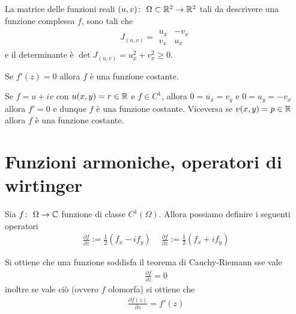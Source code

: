 \begin{corollary}
	La matrice delle funzioni reali $(u,v) \colon\ \Omega \subset \mathbb{R}^2 \rightarrow \mathbb{R}^2$ tali da descrivere una funzione complessa $f$, sono tali che  
	\begin{equation}
	\begin{aligned}
		J_{(u,v)} = \begin{array}{cc}
					u_x & - v_x\\
					v_x & u_x					
					\end{array}
	\end{aligned}
	\end{equation}
	e il determinante è $\det J_{(u,v)} = u^2_x + v^2_x \ge 0$.
\end{corollary}

\begin{corollary}
	Se $f'(z) = 0$ allora $f$ è una funzione costante.
\end{corollary}

\begin{corollary}
	Se $f = u + iv$ con $u(x,y) = r \in \mathbb{R}$ e $f \in C^1$, allora $0 = u_x = v_y$ e $0 = u_y = -v_x$ allora $f' = 0$ e dunque $f$ è una funzione costante. Viceversa se $v(x,y) = p \in \mathbb{R}$ allora $f$ è una funzione costante.   
\end{corollary}

\section{Funzioni armoniche, operatori di wirtinger}

\begin{definition}
	Sia $f \colon\ \Omega \rightarrow \mathbb{C}$ funzione di classe $C^1(\Omega)$. Allora possiamo definire i seguenti operatori
	\begin{equation}
	\begin{aligned}
		\frac{\partial f}{\partial z} := \frac{1}{2}(f_x - if_y) \quad\ \frac{\partial f}{\partial \overline{z}} := \frac{1}{2}(f_x + if_y)
	\end{aligned}
	\end{equation}
\end{definition}

\begin{remark}
	Si ottiene che una funzione soddisfa il teorema di Cauchy-Riemann sse vale 
	\begin{equation}
	\begin{aligned}
		\frac{\partial f}{\partial \overline{z}} = 0
	\end{aligned}
	\end{equation}
	inoltre se vale ciò (ovvero $f$ olomorfa) si ottiene che
	\begin{equation}
	\begin{aligned}
		\frac{\partial f(z)}{\partial z} = f'(z) 
	\end{aligned}
	\end{equation}
\end{remark}

